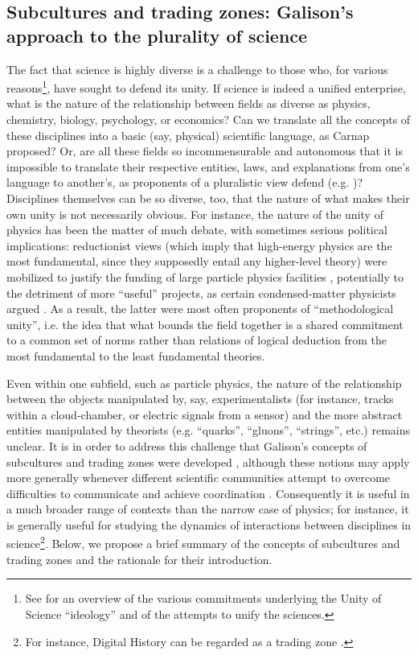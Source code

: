 \documentclass[smallextended]{svjour3}
\begin{document}
\subsection{Subcultures and trading zones: Galison's approach to the plurality of science}\label{section:galison}

The fact that science is highly diverse is a challenge to those who, for various reasons\footnote{See \citealt{Hacking1996,Bechtel2007} for an overview of the various commitments underlying the Unity of Science ``ideology'' and of the attempts to unify the sciences.}, have sought to defend its unity. If science is indeed a unified enterprise, what is the nature of the relationship between fields as diverse as physics, chemistry, biology, psychology, or economics? Can we translate all the concepts of these disciplines into a basic (say, physical) scientific language, as Carnap proposed? Or, are all these fields so incommensurable and autonomous that it is impossible to translate their respective entities, laws, and explanations from one's language to another's, as proponents of a pluralistic view defend (e.g. \citet{Suppes1978,Dupre1983,Cartwright1999})? Disciplines themselves can be so diverse, too, that the nature of what makes their own unity is not necessarily obvious. For instance, the nature of the unity of physics has been the matter of much debate, with sometimes serious political implications: reductionist views (which imply that high-energy physics are the most fundamental, since they supposedly entail any higher-level theory) were mobilized to justify the funding of large particle physics facilities \citep{Cat1998}, potentially to the detriment of more ``useful'' projects, as certain condensed-matter physicists argued \citep{martin2018solid}. As a result, the latter were most often proponents of ``methodological unity'', i.e. the idea that what bounds the field together is a shared commitment to a common set of norms rather than relations of logical deduction from the most fundamental to the least fundamental theories.

Even within one subfield, such as particle physics, the nature of the relationship between the objects manipulated by, say, experimentalists (for instance, tracks within a cloud-chamber, or electric signals from a sensor) and the more abstract entities manipulated by theorists (e.g. ``quarks'', ``gluons'', ``strings'', etc.) remains unclear. It is in order to address this challenge that Galison's concepts of subcultures and trading zones were developed \citep{galison1987how,galison1997image}, although these notions may apply more generally whenever different scientific communities attempt to overcome difficulties to communicate and achieve coordination \citep[p.~8]{Collins2010}. Consequently it is useful in a much broader range of contexts than the narrow case of physics; for instance, it is generally useful for studying the dynamics of interactions between disciplines in science\footnote{For instance, Digital History can be regarded as a trading zone \citep{Kemman2021}.}. Below, we propose a brief summary of the concepts of subcultures and trading zones and the rationale for their introduction.
\end{document}
